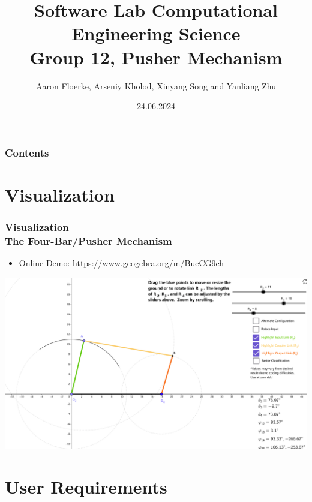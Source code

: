 \documentclass[ucs,10pt]{beamer}
\begin{document}
\title[{\tt info@stce.rwth-aachen.de}]{\textcolor{rwth-blue}{Software Lab Computational Engineering Science} \vspace{.2cm} \\ {\small Group 12, Pusher Mechanism}}
\author[Group 12)]{Aaron Floerke, Arseniy Kholod, Xinyang Song and Yanliang Zhu} 
\date[]{24.06.2024}



\begin{frame}[plain]
\titlepage
\end{frame}

\begin{frame}
	\frametitle{Contents}
\tableofcontents
\end{frame}



\section{Visualization}

\begin{frame}
\frametitle{Visualization \\
    \small \color{rwth-blue} The Four-Bar/Pusher Mechanism}
    \begin{itemize}
        \item Online Demo: \url{https://www.geogebra.org/m/BueCG9ch}
    \end{itemize}
    \includegraphics[width=0.9\linewidth]{./Used_Picture/Online_Demo_1.png}
\end{frame}



\section{User Requirements}
\end{document}

